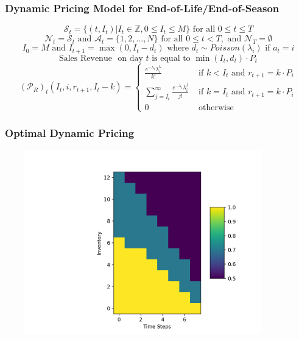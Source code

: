 \documentclass[handout]{beamer}
\begin{document}
\begin{frame}
\frametitle{Dynamic Pricing Model for End-of-Life/End-of-Season}
\pause
$$\mathcal{S}_t = \{(t, I_t) | I_t \in \mathbb{Z}, 0 \leq I_t \leq M\} \text{ for all } 0 \leq t \leq T$$
\pause
$$\mathcal{N}_t = \mathcal{S}_t \text{ and } \mathcal{A}_t = \{1, 2, \ldots, N\} \text{ for all } 0 \leq t < T, \text{ and } \mathcal{N}_T =\emptyset$$
\pause
$$I_0 = M \text{ and } I_{t+1} = \max(0, I_t - d_t) \text{ where } d_t \sim Poisson(\lambda_i) \text{ if } a_t = i$$
\pause
$$\text{Sales Revenue } \text{ on day } t \text{ is equal to } \min(I_t, d_t) \cdot P_t$$
\pause
$$
 (\mathcal{P}_R)_t(I_t, i, r_{t+1}, I_t - k) =
 \begin{cases}
 \frac {e^{-\lambda_i} \lambda_i^{k}} {k!} & \text{ if } k < I_t \text{ and } r_{t+1} = k \cdot P_i\\
 \sum_{j=I_t}^{\infty} \frac {e^{-\lambda_i} \lambda_i^{j}} {j!} & \text{ if } k = I_t \text{ and } r_{t+1} = k \cdot P_i\\
 0 & \text{ otherwise }
 \end{cases}
 $$
\end{frame}

\begin{frame}
\frametitle{Optimal Dynamic Pricing}
\includegraphics[width=12cm, height=8cm]{dynamic_pricing.png}
\end{frame}
\end{document}

